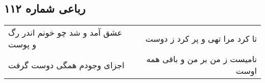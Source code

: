 \begin{center}
\section*{رباعی شماره ۱۱۲}
\label{sec:sh112}
\begin{longtable}{l p{0.5cm} r}
عشق آمد و شد چو خونم اندر رگ و پوست
&&
تا کرد مرا تهی و پر کرد ز دوست
\\
اجزای وجودم همگی دوست گرفت
&&
نامیست ز من بر من و باقی همه اوست
\\
\end{longtable}
\end{center}
